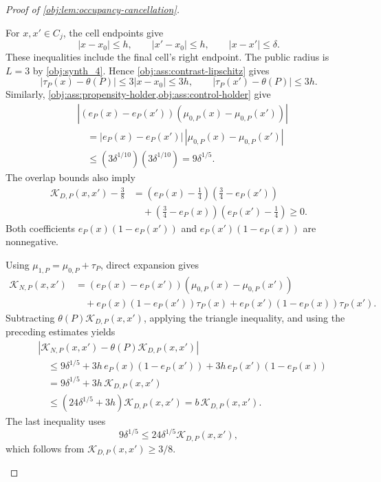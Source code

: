 \documentclass[11pt]{article}
\begin{document}
\begin{proof}[Proof of \cref{obj:lem:occupancy-cancellation}]
\begin{enumerate}
For \(x,x'\in C_j\), the cell endpoints give
\[
|x-x_0|\le h,\qquad
|x'-x_0|\le h,\qquad
|x-x'|\le\delta.
\]
These inequalities include the final cell's right endpoint. The public radius is \(L=3\) by \cref{obj:synth_4}. Hence
\cref{obj:ass:contrast-lipschitz} gives
\[
|\tau_P(x)-\theta(P)|
\le3|x-x_0|\le3h,
\qquad
|\tau_P(x')-\theta(P)|\le3h.
\]
Similarly, \cref{obj:ass:propensity-holder,obj:ass:control-holder} give
\[
\begin{aligned}
&\left|
(e_P(x)-e_P(x'))
(\mu_{0,P}(x)-\mu_{0,P}(x'))
\right|\\
&\quad=
|e_P(x)-e_P(x')|\,
|\mu_{0,P}(x)-\mu_{0,P}(x')|\\
&\quad\le
(3\delta^{1/10})(3\delta^{1/10})
=9\delta^{1/5}.
\end{aligned}
\]
The overlap bounds also imply
\[
\begin{aligned}
\mathcal K_{D,P}(x,x')-\frac38
&=
\left(e_P(x)-\frac14\right)
\left(\frac34-e_P(x')\right)\\
&\quad+
\left(\frac34-e_P(x)\right)
\left(e_P(x')-\frac14\right)
\ge0.
\end{aligned}
\]
Both coefficients \(e_P(x)(1-e_P(x'))\) and
\(e_P(x')(1-e_P(x))\) are nonnegative.

Using \(\mu_{1,P}=\mu_{0,P}+\tau_P\), direct expansion gives
\[
\begin{aligned}
\mathcal K_{N,P}(x,x')
&=
(e_P(x)-e_P(x'))
(\mu_{0,P}(x)-\mu_{0,P}(x'))\\
&\quad+
e_P(x)(1-e_P(x'))\tau_P(x)
+e_P(x')(1-e_P(x))\tau_P(x').
\end{aligned}
\]
Subtracting \(\theta(P)\mathcal K_{D,P}(x,x')\), applying the triangle inequality, and using the preceding estimates yields
\[
\begin{aligned}
&|\mathcal K_{N,P}(x,x')
      -\theta(P)\mathcal K_{D,P}(x,x')|\\
&\quad\le
9\delta^{1/5}
+3h\,e_P(x)(1-e_P(x'))
+3h\,e_P(x')(1-e_P(x))\\
&\quad=
9\delta^{1/5}+3h\,\mathcal K_{D,P}(x,x')\\
&\quad\le
(24\delta^{1/5}+3h)\mathcal K_{D,P}(x,x')
=b\,\mathcal K_{D,P}(x,x').
\end{aligned}
\]
The last inequality uses
\[
9\delta^{1/5}
\le24\delta^{1/5}\mathcal K_{D,P}(x,x'),
\]
which follows from \(\mathcal K_{D,P}(x,x')\ge3/8\).


\end{enumerate}
\end{proof}
\end{document}

